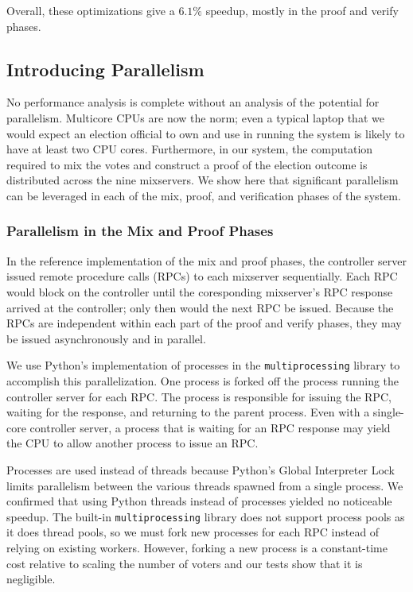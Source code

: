Overall, these optimizations give a $6.1\%$ speedup, mostly in the proof and verify phases.

\subsection{Introducing Parallelism}

No performance analysis is complete without an analysis of the potential for parallelism. Multicore CPUs are now the norm; even a typical laptop that we would expect an election official to own and use in running the system is likely to have at least two CPU cores. Furthermore, in our system, the computation required to mix the votes and construct a proof of the election outcome is distributed across the nine mixservers. We show here that significant parallelism can be leveraged in each of the mix, proof, and verification phases of the system.

\subsubsection{Parallelism in the Mix and Proof Phases}

In the reference implementation of the mix and proof phases, the controller server issued remote procedure calls (RPCs) to each mixserver sequentially. Each RPC would block on the controller until the coresponding mixserver's RPC response arrived at the controller; only then would the next RPC be issued. Because the RPCs are independent within each part of the proof and verify phases, they may be issued asynchronously and in parallel.

We use Python's implementation of processes in the \texttt{multiprocessing} library to accomplish this parallelization. One process is forked off the process running the controller server for each RPC. The process is responsible for issuing the RPC, waiting for the response, and returning to the parent process. Even with a single-core controller server, a process that is waiting for an RPC response may yield the CPU to allow another process to issue an RPC.

Processes are used instead of threads because Python's Global Interpreter Lock limits parallelism between the various threads spawned from a single process. We confirmed that using Python threads instead of processes yielded no noticeable speedup. The built-in \texttt{multiprocessing} library does not support process pools as it does thread pools, so we must fork new processes for each RPC instead of relying on existing workers. However, forking a new process is a constant-time cost relative to scaling the number of voters and our tests show that it is negligible.


